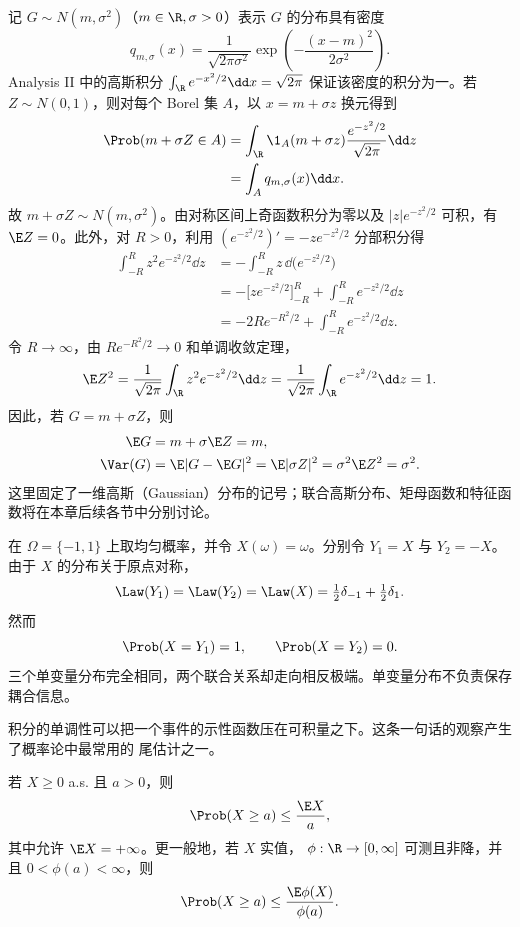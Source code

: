 \begin{example}[一维高斯分布]\label{ex:5-1-1-gaussian-law}
记 $G\sim N(m,\sigma^2)$（$m\in\R,\sigma>0$）表示 $G$ 的分布具有密度
\[
 q_{m,\sigma}(x)=\frac1{\sqrt{2\pi\sigma^2}}
 \exp\!\left(-\frac{(x-m)^2}{2\sigma^2}\right).
\]
Analysis II 中的高斯积分
$\int_\R e^{-x^2/2}\dd x=\sqrt{2\pi}$ 保证该密度的积分为一。若
$Z\sim N(0,1)$，则对每个 Borel 集 $A$，以 $x=m+\sigma z$ 换元得到
\begin{align*}
 \Prob(m+\sigma Z\in A)
 &=\int_\R\1_A(m+\sigma z)\frac{e^{-z^2/2}}{\sqrt{2\pi}}\dd z\\
 &=\int_A q_{m,\sigma}(x)\dd x.
\end{align*}
故 $m+\sigma Z\sim N(m,\sigma^2)$。由对称区间上奇函数积分为零以及
$|z|e^{-z^2/2}$ 可积，有 $\E Z=0$。此外，对 $R>0$，利用
$(e^{-z^2/2})'=-ze^{-z^2/2}$ 分部积分得
\begin{align*}
 \int_{-R}^{R}z^2e^{-z^2/2}\dd z
 &=-\int_{-R}^{R}z\,\dd\bigl(e^{-z^2/2}\bigr)\\
 &=-\bigl[ze^{-z^2/2}\bigr]_{-R}^{R}
   +\int_{-R}^{R}e^{-z^2/2}\dd z\\
 &=-2Re^{-R^2/2}+\int_{-R}^{R}e^{-z^2/2}\dd z.
\end{align*}
令 $R\to\infty$，由 $Re^{-R^2/2}\to0$ 和单调收敛定理，
\[
 \E Z^2=\frac1{\sqrt{2\pi}}\int_\R z^2e^{-z^2/2}\dd z
 =\frac1{\sqrt{2\pi}}\int_\R e^{-z^2/2}\dd z=1.
\]
因此，若 $G=m+\sigma Z$，则
\begin{align*}
 \E G&=m+\sigma\E Z=m,\\
 \Var(G)&=\E|G-\E G|^2
 =\E|\sigma Z|^2=\sigma^2\E Z^2=\sigma^2.
\end{align*}
这里固定了一维高斯（Gaussian）分布的记号；联合高斯分布、矩母函数和特征函数将在本章后续各节中分别讨论。
\end{example}

\begin{example}[同分布不同耦合]\label{ex:5-1-1-3}
在 $\Omega=\{-1,1\}$ 上取均匀概率，并令 $X(\omega)=\omega$。分别令
$Y_1=X$ 与 $Y_2=-X$。由于 $X$ 的分布关于原点对称，
\[
 \Law(Y_1)=\Law(Y_2)=\Law(X)=\tfrac12\delta_{-1}+\tfrac12\delta_1.
\]
然而
\[
 \Prob(X=Y_1)=1,
 \qquad
 \Prob(X=Y_2)=0.
\]
三个单变量分布完全相同，两个联合关系却走向相反极端。单变量分布不负责保存耦合信息。
\end{example}

积分的单调性可以把一个事件的示性函数压在可积量之下。这条一句话的观察产生了概率论中最常用的
尾估计之一。

\begin{theorem}\label{theorem:5-1-1-2}
若 $X\ge0$ a.s. 且 $a>0$，则
\[
 \Prob(X\ge a)\le\frac{\E X}{a},
\]
其中允许 $\E X=+\infty$。更一般地，若 $X$ 实值，
$\phi:\R\to[0,\infty]$ 可测且非降，并且 $0<\phi(a)<\infty$，则
\[
 \Prob(X\ge a)\le\frac{\E\phi(X)}{\phi(a)}.
\]
\end{theorem}

